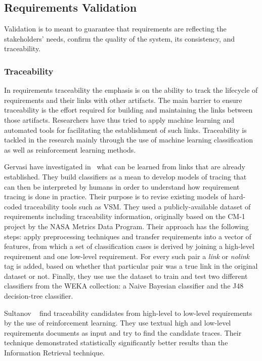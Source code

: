 \subsection{Requirements Validation}

Validation is to meant to guarantee that requirements are reflecting the
stakeholders' needs, confirm the quality of the system, its consistency, and
traceability.

\subsubsection{Traceability}

In requirements traceability the emphasis is on the ability to track the
lifecycle of requirements and their links with other artifacts. The main barrier
to ensure traceability is the effort required for building and maintaining the
links between those artifacts. Researchers have thus tried to apply
machine learning and automated tools for facilitating the establishment of such
links\cite{Gervasi:2011}.
Traceability is tackled in the research mainly through the use of machine
learning classification as well as reinforcement learning methods.

Gervasi \etal have investigated in~\cite{Gervasi:2011} what can be learned from
links that are already established. They build classifiers as a mean to develop models
of tracing that can then be interpreted by humans in order to understand how
requirement tracing is done in practice. Their purpose is to revise existing models of
hard-coded traceability tools such as VSM. They used a publicly-available
dataset of requirements including traceability information, originally based on
the CM-1 project by the NASA Metrics Data Program. Their approach has the following
steps: apply preprocessing techniques and transfer requirements into a
vector of features, from which a set of classification cases is derived by
joining a high-level requirement and one low-level requirement. For every such
pair a \textit{link} or \textit{nolink} tag is added, based on whether that
particular pair was a true link in the original dataset or not. Finally, they
use use the dataset to train and test two different classifiers from the WEKA
collection: a Naive Bayesian classifier and the J48 decision-tree classifier.

Sultanov \etal~\cite{Sultanov:2013} find traceability candidates from
high-level to low-level requirements by the use of reinforcement
learning. They use textual high and low-level requirements documents as input and try to
find the candidate traces. Their technique demonstrated statistically
significantly better results than the Information Retrieval
technique.





